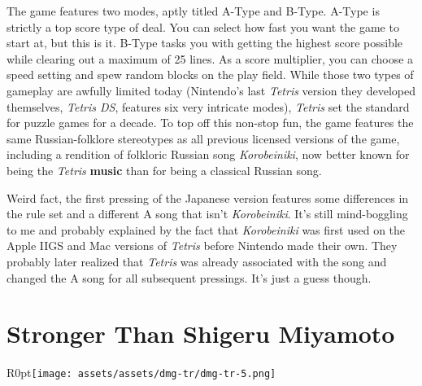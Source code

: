 \documentclass{book}
\begin{document}
The game features two modes, aptly titled A-Type and B-Type. A-Type is strictly a top score type of deal. You can select how fast you want the game to start at, but this is it. B-Type tasks you with getting the highest score possible while clearing out a maximum of 25 lines. As a score multiplier, you can choose a speed setting and spew random blocks on the play field. While those two types of gameplay are awfully limited today (Nintendo’s last \emph{Tetris} version they developed themselves, \emph{Tetris DS}, features six very intricate modes), \emph{Tetris} set the standard for puzzle games for a decade. To top off this non-stop fun, the game features the same Russian-folklore stereotypes as all previous licensed versions of the game, including a rendition of folkloric Russian song \emph{Korobeiniki}, now better known for being the \emph{Tetris} \textbf{music} than for being a classical Russian song.\par
\FloatBarrier\vspace{\baselineskip}\begin{figure}[H]\end{figure}
Weird fact, the first pressing of the Japanese version features some differences in the rule set and a different A song that isn’t \emph{Korobeiniki}. It’s still mind-boggling to me and probably explained by the fact that \emph{Korobeiniki} was first used on the Apple IIGS and Mac versions of \emph{Tetris} before Nintendo made their own. They probably later realized that \emph{Tetris} was already associated with the song and changed the A song for all subsequent pressings. It’s just a guess though.\par
\FloatBarrier\section*{Stronger Than Shigeru Miyamoto}
\begin{wrapfigure}{R}{0pt}{\texttt{[image: assets/assets/dmg-tr/dmg-tr-5.png]}}\end{wrapfigure}
\end{document}
